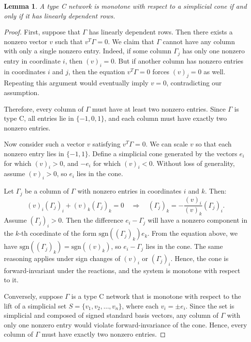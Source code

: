\documentclass{article}
\newtheorem{lem}{Lemma}
\begin{document}
\begin{lem}
\label{lem:type C simplicial iff dependent rows}
A type C network is monotone with respect to a simplicial cone if and only if it has linearly dependent rows.
\end{lem}

\begin{proof}
First, suppose that \( \Gamma \) has linearly dependent rows. Then there exists a nonzero vector \( v \) such that \( v^T \Gamma = 0 \). We claim that \( \Gamma \) cannot have any column with only a single nonzero entry. Indeed, if some column \( \Gamma_j \) has only one nonzero entry in coordinate \( i \), then \( (v)_i = 0 \). But if another column has nonzero entries in coordinates \( i \) and \( j \), then the equation \( v^T \Gamma = 0 \) forces \( (v)_j = 0 \) as well. Repeating this argument would eventually imply \( v = 0 \), contradicting our assumption. 

Therefore, every column of \( \Gamma \) must have at least two nonzero entries. Since \( \Gamma \) is type C, all entries lie in \( \{-1, 0, 1\} \), and each column must have exactly two nonzero entries.

Now consider such a vector \( v \) satisfying \( v^T \Gamma = 0 \). We can scale \( v \) so that each nonzero entry lies in \( \{ -1, 1 \} \). Define a simplicial cone generated by the vectors \( e_i \) for which \( (v)_i > 0 \), and \( -e_i \) for which \( (v)_i < 0 \). Without loss of generality, assume \( (v)_i > 0 \), so \( e_i \) lies in the cone.

Let \( \Gamma_j \) be a column of \( \Gamma \) with nonzero entries in coordinates \( i \) and \( k \). Then:
\[
(v)_i (\Gamma_j)_i + (v)_k (\Gamma_j)_k = 0 \quad \Rightarrow \quad (\Gamma_j)_k = -\frac{(v)_i}{(v)_k} (\Gamma_j)_i.
\]
Assume \( (\Gamma_j)_i > 0 \). Then the difference \( e_i - \Gamma_j \) will have a nonzero component in the \( k \)-th coordinate of the form \( \mathrm{sgn}((\Gamma_j)_k) e_k \). From the equation above, we have \( \mathrm{sgn}((\Gamma_j)_k) = \mathrm{sgn}((v)_k) \), so \( e_i - \Gamma_j \) lies in the cone. The same reasoning applies under sign changes of \( (v)_i \) or \( (\Gamma_j)_i \). Hence, the cone is forward-invariant under the reactions, and the system is monotone with respect to it.

Conversely, suppose \( \Gamma \) is a type C network that is monotone with respect to the lift of a simplicial set \( S = \{v_1, v_2, \dots, v_n\} \), where each \( v_i = \pm e_i \). Since the set is simplicial and composed of signed standard basis vectors, any column of \( \Gamma \) with only one nonzero entry would violate forward-invariance of the cone. Hence, every column of \( \Gamma \) must have exactly two nonzero entries.


\end{proof}
\end{document}
